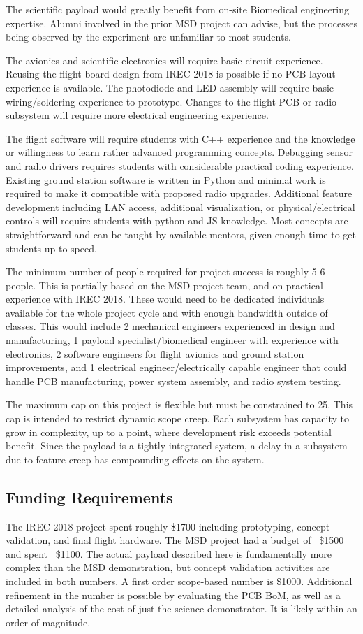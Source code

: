 \documentclass[conference]{IEEEtran} %
\begin{document}
The scientific payload would greatly benefit from on-site Biomedical engineering expertise. Alumni involved in the prior MSD project can advise, but the processes being observed by the experiment are unfamiliar to most students.

The avionics and scientific electronics will require basic circuit experience. Reusing the flight board design from IREC 2018 is possible if no PCB layout experience is available. The photodiode and LED assembly will require basic wiring/soldering experience to prototype. Changes to the flight PCB or radio subsystem will require more electrical engineering experience.

The flight software will require students with C++ experience and the knowledge or willingness to learn rather advanced programming concepts. Debugging sensor and radio drivers requires students with considerable practical coding experience. Existing ground station software is written in Python and minimal work is required to make it compatible with proposed radio upgrades. Additional feature development including LAN access, additional visualization, or physical/electrical controls will require students with python and JS knowledge. Most concepts are straightforward and can be taught by available mentors, given enough time to get students up to speed.

The minimum number of people required for project success is roughly 5-6 people. This is partially based on the MSD project team, and on practical experience with IREC 2018. These would need to be dedicated individuals available for the whole project cycle and with enough bandwidth outside of classes. This would include 2 mechanical engineers experienced in design and manufacturing, 1 payload specialist/biomedical engineer with experience with electronics, 2 software engineers for flight avionics and ground station improvements, and 1 electrical engineer/electrically capable engineer that could handle PCB manufacturing, power system assembly, and radio system testing.

The maximum cap on this project is flexible but must be constrained to 25. This cap is intended to restrict dynamic scope creep. Each subsystem has capacity to grow in complexity, up to a point, where development risk exceeds potential benefit. Since the payload is a tightly integrated system, a delay in a subsystem due to feature creep has compounding effects on the system. 

\subsection{Funding Requirements}
The IREC 2018 project spent roughly \$1700 including prototyping, concept validation, and final flight hardware. The MSD project had a budget of ~\$1500 and spent ~\$1100. The actual payload described here is fundamentally more complex than the MSD demonstration, but concept validation activities are included in both numbers. A first order scope-based number is \$1000. Additional refinement in the number is possible by evaluating the PCB BoM, as well as a detailed analysis of the cost of just the science demonstrator. It is likely within an order of magnitude.
\end{document}
